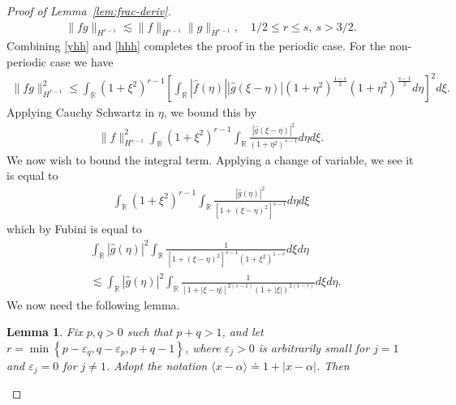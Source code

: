 \documentclass[12pt,reqno]{amsart}
\numberwithin{equation}{section}  %
\numberwithin{figure}{section}
\newcommand{\rr}{\mathbb{R}}
\newcommand{\wh}{\widehat}
\newcommand{\ee}{\varepsilon}
\newtheorem{lemma}[theorem]{Lemma}
\begin{document}
\begin{proof}[Proof of Lemma~\ref{lem:frac-deriv}]
\begin{equation}
\begin{split}
\| f g \|_{H^{r-1}} \lesssim \|f \|_{H^{s-1}}
\| g \|_{H^{r-1}}, \quad 1/2 \le r \le s, \ s > 3/2. 
\end{split}
\end{equation}
%
Combining \eqref{yhh} and \eqref{hhh} completes the proof in the periodic
case. For the non-periodic case we have
%
%
\begin{equation*}
\begin{split}
\| fg\|_{H^{r-1}}^{2}
\le \int_{\rr}  (1 + \xi^{2})^{r-1}\left [ \int_{\rr}
| \wh{f}(\eta) |  | \wh{g}(\xi - \eta) | (1 +
\eta^{2})^{\frac{1-s}{2}} (1 + \eta^{2})^{\frac{s-1}{2}}
d \eta \right ]^{2} d \xi.
\end{split}
\end{equation*}
%
Applying Cauchy Schwartz in $\eta$, we bound this by
%
%
%
\begin{equation*}
\begin{split}
\| f \|_{H^{s-1}}^{2} \int_{\rr}  (1 + \xi^{2})^{r-1}\int_{\rr} \frac{|
\wh{g}(\xi - \eta) |^{2}}{(1 + \eta^{2})^{s-1}} d \eta d \xi.
\end{split}
\end{equation*}
%
We now wish to bound the integral term. Applying a change of variable, we see it
is equal to
%
\begin{equation*}
\begin{split}
\int_{\rr} (1 + \xi^{2})^{r-1} \int_{\rr}
\frac{| \wh{g}(\eta) |^{2}}{[1 + (\xi - \eta)^{2}]^{s-1}} d \eta d \xi
\end{split}
\end{equation*}
which by Fubini is equal to
%
%
\begin{equation}
\label{int-pre-calc-lem}
\begin{split}
& \int_{\rr} | \wh{g}(\eta) |^{2} \int_{\rr} \frac{1}{\left[
1 + (\xi - \eta)^{2} \right]^{s-1} (1 + \xi^{2})^{1-r}} d \xi d \eta
\\
& \lesssim \int_{\rr} | \wh{g}(\eta) |^{2} \int_{\rr} \frac{1}{\left[
1 + |\xi - \eta| \right]^{2(s-1)} (1 + |\xi|)^{2(1-r)}} d \xi d \eta.
\end{split}
\end{equation}
%
%
We now need the following lemma. 
%
%
\begin{lemma}
\label{lem:calc}
%
Fix $p, q > 0$ such that $p +q >1$, and let $r =\min\left\{p - \ee_{q}, q -
\ee_{p}, p+q-1 \right\}$, where $\ee_{j} > 0$ is arbitrarily small for $j = 1$
and $\ee_{j} = 0$ for $j \neq 1$. Adopt the notation
$\langle x - \alpha \rangle  \doteq 1 + | x - \alpha |$. Then 
%
\begin{equation*}

\end{equation*}
\end{lemma}
\end{proof}
\end{document}
